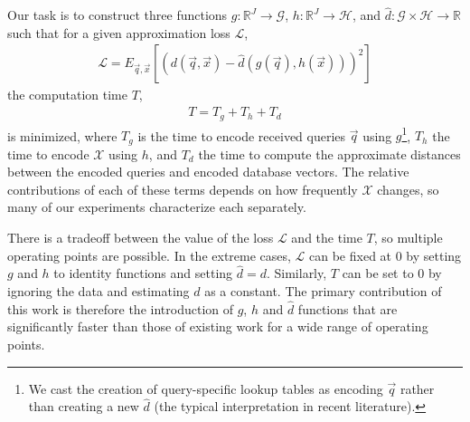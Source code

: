 Our task is to construct three functions $g: \mathbb{R}^J \rightarrow \mathcal{G}$, $h: \mathbb{R}^J \rightarrow \mathcal{H}$, and $\hat{d}: \mathcal{G} \times \mathcal{H} \rightarrow \mathbb{R}$ such that for a given approximation loss $\mathcal{L}$,
\begin{align}
    \mathcal{L} = E_{\vec{q},\vec{x}}[(d(\vec{q}, \vec{x}) - \hat{d}(g(\vec{q}), h(\vec{x})))^2]
\end{align}
the computation time $T$,
\begin{align}
    T = T_g + T_h + T_d
\end{align}
is minimized, where $T_g$ is the time to encode received queries $\vec{q}$ using $g$\footnote{We cast the creation of query-specific lookup tables as encoding $\vec{q}$ rather than creating a new $\hat{d}$ (the typical interpretation in recent literature).}, $T_h$ the time to encode $\mathcal{X}$ using $h$, and $T_d$ the time to compute the approximate distances between the encoded queries and encoded database vectors. The relative contributions of each of these terms depends on how frequently $\mathcal{X}$ changes, so many of our experiments characterize each separately. %



There is a tradeoff between the value of the loss $\mathcal{L}$ and the time $T$, so multiple operating points are possible. In the extreme cases, $\mathcal{L}$ can be fixed at 0 by setting $g$ and $h$ to identity functions and setting $\hat{d} = d$. Similarly, $T$ can be set to $0$ by ignoring the data and estimating $d$ as a constant. The primary contribution of this work is therefore the introduction of $g$, $h$ and $\hat{d}$ functions that are significantly faster than those of existing work for a wide range of operating points.


